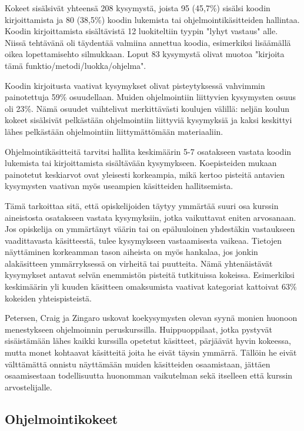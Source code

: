 \documentclass[finnish]{../tktltiki2}
\theoremstyle{definition}
\theoremstyle{remark}
\begin{document}
Kokeet sisälsivät yhteensä 208 kysymystä, joista 95 (45,7\%) sisälsi koodin kirjoittamista ja 80 (38,5\%) koodin lukemista tai ohjelmointikäsitteiden hallintaa. Koodin kirjoittamista sisältävistä 12 luokiteltiin tyypin "lyhyt vastaus" alle. Niissä tehtävänä oli täydentää valmiina annettua koodia, esimerkiksi lisäämällä oikea lopettamisehto silmukkaan. Loput 83 kysymystä olivat muotoa "kirjoita tämä funktio/metodi/luokka/ohjelma".

Koodin kirjoitusta vaativat kysymykset olivat pisteytyksessä vahvimmin painotettuja 59\% osuudellaan. Muiden ohjelmointiin liittyvien kysymysten osuus oli 23\%. Nämä osuudet vaihtelivat merkittävästi koulujen välillä: neljän koulun kokeet sisälsivät pelkästään ohjelmointiin liittyviä kysymyksiä ja kaksi keskittyi lähes pelkästään ohjelmointiin liittymättömään materiaaliin.

Ohjelmointikäsitteitä tarvitsi hallita keskimäärin 5-7 osatakseen vastata koodin lukemista tai kirjoittamista sisältävään kysymykseen. Koepisteiden mukaan painotetut keskiarvot ovat yleisesti korkeampia, mikä kertoo pisteitä antavien kysymysten vaativan myös useampien käsitteiden hallitsemista.

Tämä tarkoittaa sitä, että opiskelijoiden täytyy ymmärtää suuri osa kurssin aineistosta osatakseen vastata kysymyksiin, jotka vaikuttavat eniten arvosanaan. Jos opiskelija on ymmärtänyt väärin tai on epäluuloinen yhdestäkin vastaukseen vaadittavasta käsitteestä, tulee kysymykseen vastaamisesta vaikeaa. Tietojen näyttäminen korkeamman tason aiheista on myös hankalaa, jos jonkin alakäsitteen ymmärryksessä on virheitä tai puutteita. Nämä yhtenäistävät kysymykset antavat selvän enemmistön pisteitä tutkituissa kokeissa. Esimerkiksi keskimäärin yli kuuden käsitteen omaksumista vaativat kategoriat kattoivat 63\% kokeiden yhteispisteistä.

Petersen, Craig ja Zingaro uskovat koekysymysten olevan syynä monien huonoon menestykseen ohjelmoinnin peruskurssilla. Huippuoppilaat, jotka pystyvät sisäistämään lähes kaikki kurssilla opetetut käsitteet, pärjäävät hyvin kokeessa, mutta monet kohtaavat käsitteitä joita he eivät täysin ymmärrä. Tällöin he eivät välttämättä onnistu näyttämään muiden käsitteiden osaamistaan, jättäen osaamisestaan todellisuutta huonomman vaikutelman sekä itselleen että kurssin arvostelijalle.

\subsection{Ohjelmointikokeet}
\end{document}
